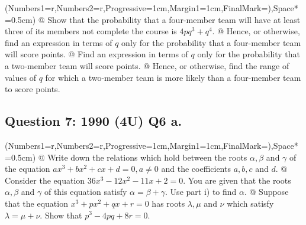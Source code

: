 \documentclass[a4paper,11pt]{article}
\begin{document}
	\begin{easylist}[enumerate]
		\ListProperties(Numbers1=r,Numbers2=r,Progressive=1cm,Margin1=1cm,FinalMark={)},Space*=0.5cm)
		@ Show that the probability that a four-member team will have at least three of its members not complete the course is $4pq^3+q^4$.
        @ Hence, or otherwise, find an expression in terms of $q$ only for the probability that a four-member team will score points.
        @ Find an expression in terms of $q$ only for the probability that a two-member team will score points.
        @ Hence, or otherwise, find the range of values of $q$ for which a two-member team is more likely than a four-member team to score points.
    \end{easylist}
    
    \subsection*{Question 7: 1990 (4U) Q6 a.}
	\begin{easylist}[enumerate]
		\ListProperties(Numbers1=r,Numbers2=r,Progressive=1cm,Margin1=1cm,FinalMark={)},Space*=0.5cm)
		@ Write down the relations which hold between the roots $\alpha,\beta$ and $\gamma$ of the equation $ax^3+bx^2+cx+d=0,a\neq0$ and the coefficients $a,b,c$ and $d$.
        @ Consider the equation $36x^3-12x^2-11x+2=0$. You are given that the roots $\alpha, \beta$ and $\gamma$ of this equation satisfy $\alpha=\beta+\gamma$. Use part i) to find $\alpha$. 
        @ Suppose that the equation $x^3+px^2+qx+r=0$ has roots $\lambda, \mu$ and $\nu$ which satisfy $\lambda=\mu+\nu$. Show that $p^3-4pq+8r=0$.
    \end{easylist}
\end{document}
